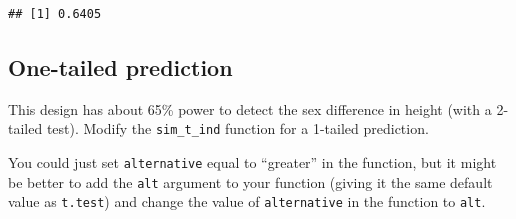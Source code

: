 \documentclass[
  oneside]{book}
\newenvironment{Shaded}{\begin{snugshade}}{\end{snugshade}}
\newcommand{\AttributeTok}[1]{\textcolor[rgb]{0.77,0.63,0.00}{#1}}
\newcommand{\ConstantTok}[1]{\textcolor[rgb]{0.00,0.00,0.00}{#1}}
\newcommand{\ControlFlowTok}[1]{\textcolor[rgb]{0.13,0.29,0.53}{\textbf{#1}}}
\newcommand{\DecValTok}[1]{\textcolor[rgb]{0.00,0.00,0.81}{#1}}
\newcommand{\FloatTok}[1]{\textcolor[rgb]{0.00,0.00,0.81}{#1}}
\newcommand{\FunctionTok}[1]{\textcolor[rgb]{0.00,0.00,0.00}{#1}}
\newcommand{\NormalTok}[1]{#1}
\newcommand{\OtherTok}[1]{\textcolor[rgb]{0.56,0.35,0.01}{#1}}
\newcommand{\SpecialCharTok}[1]{\textcolor[rgb]{0.00,0.00,0.00}{#1}}
\newcommand{\StringTok}[1]{\textcolor[rgb]{0.31,0.60,0.02}{#1}}
\begin{document}
\begin{Shaded}
\end{Shaded}

\begin{verbatim}
## [1] 0.6405
\end{verbatim}

\hypertarget{one-tailed-prediction}{%
\subsection{One-tailed prediction}\label{one-tailed-prediction}}

This design has about 65\% power to detect the sex difference in height (with a 2-tailed test). Modify the \texttt{sim\_t\_ind} function for a 1-tailed prediction.

You could just set \texttt{alternative} equal to ``greater'' in the function, but it might be better to add the \texttt{alt} argument to your function (giving it the same default value as \texttt{t.test}) and change the value of \texttt{alternative} in the function to \texttt{alt}.

\begin{Shaded}
\end{Shaded}
\end{document}
